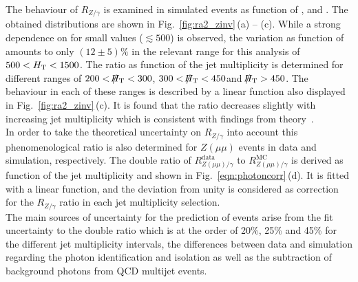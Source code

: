 The behaviour of $R_{Z/\gamma}$ is examined in simulated events as function of \MHT, \HT and \NJets. The obtained distributions are shown in Fig.~\ref{fig:ra2_zinv}\,(a) -- (c). While a strong dependence on \MHT for small values ($\lesssim 500$\gev) is observed, the variation as function of \HT amounts to only $(12 \pm 5)\%$ in the relevant range for this analysis of $500 < H_{\text{T}} < 1500$\gev. The ratio as function of the jet multiplicity is determined for different \MHT ranges of $200 < \slash\mkern-12mu{H}_{\text{T}} < 300$\gev, $300 < \slash\mkern-12mu{H}_{\text{T}} < 450$\gev and $\slash\mkern-12mu{H}_{\text{T}} > 450$\gev. The behaviour in each of these \MHT ranges is described by a linear function also displayed in Fig.~\ref{fig:ra2_zinv}\,(c). It is found that the ratio decreases slightly with increasing jet multiplicity which is consistent with findings from theory~\cite{Bern:2012vx, Bern:2011pa}. \\
In order to take the theoretical uncertainty on $R_{Z/\gamma}$ into account this phenomenological ratio is also determined for $Z(\mu\mu)$ events in data and simulation, respectively. The double ratio of $R_{Z(\mu\mu)/\gamma}^{\text{data}}$ to $R_{Z(\mu\mu)/\gamma}^{\text{MC}}$ is derived as function of the jet multiplicity and shown in Fig.~\ref{eqn:photoncorr}\,(d). It is fitted with a linear function, and the deviation from unity is considered as correction for the $R_{Z/\gamma}$ ratio in each jet multiplicity selection. \\
The main sources of uncertainty for the prediction of \ZInvJets events arise from the fit uncertainty to the double ratio which is at the order of 20\%, 25\% and 45\% for the different jet multiplicity intervals, the differences between data and simulation regarding the photon identification and isolation as well as the subtraction of background photons from QCD multijet events.

